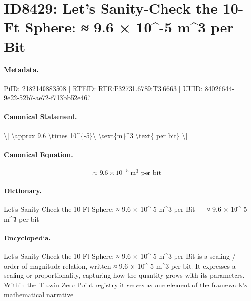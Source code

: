 \section*{ID8429: Let’s Sanity-Check the 10-Ft Sphere: ≈ 9.6 × 10\textasciicircum{}-5 m\textasciicircum{}3 per Bit}
\paragraph{Metadata.}
PiID: 2182140883508 | RTEID: RTE:P32731.6789:T3.6663 | UUID: 84026644-9e22-52b7-ae72-f713bb52e467

\paragraph{Canonical Statement.}
\textbackslash{}[ \textbackslash{}approx 9.6 \textbackslash{}times 10\textasciicircum{}\{-5\}\textbackslash{} \textbackslash{}text\{m\}\textasciicircum{}3 \textbackslash{}text\{ per bit\} \textbackslash{}]

\paragraph{Canonical Equation.}
\[
\approx 9.6 \times 10^{-5}\ \text{m}^3 \text{ per bit}
\]

\paragraph{Dictionary.}
Let’s Sanity-Check the 10-Ft Sphere: ≈ 9.6 × 10\textasciicircum{}-5 m\textasciicircum{}3 per Bit — ≈ 9.6 × 10\textasciicircum{}-5 m\textasciicircum{}3 per bit

\paragraph{Encyclopedia.}
Let’s Sanity-Check the 10-Ft Sphere: ≈ 9.6 × 10\textasciicircum{}-5 m\textasciicircum{}3 per Bit is a scaling / order-of-magnitude relation, written ≈ 9.6 × 10\textasciicircum{}-5 m\textasciicircum{}3 per bit. It expresses a scaling or proportionality, capturing how the quantity grows with its parameters. Within the Trawin Zero Point registry it serves as one element of the framework's mathematical narrative.
